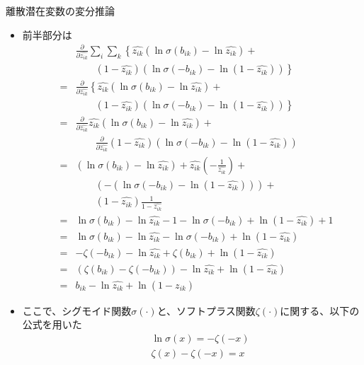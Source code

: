 \documentclass[dvipdfmx,notheorems,t]{beamer}
\begin{document}
\begin{frame}{離散潜在変数の変分推論}
\begin{itemize}
\begin{itemize}
		\item 前半部分は
		\begin{eqnarray}
			&& \frac{\partial}{\partial \widehat{z_{ik}}} \sum_i \sum_k \left\{ \widehat{z_{ik}} \left( \ln \sigma(b_{ik}) - \ln \widehat{z_{ik}} \right) + \right. \nonumber \\
			&& \qquad \left. \left( 1 - \widehat{z_{ik}} \right) \left( \ln \sigma(-b_{ik}) - \ln \left( 1 - \widehat{z_{ik}} \right) \right) \right\} \\
			&=& \frac{\partial}{\partial \widehat{z_{ik}}} \left\{ \widehat{z_{ik}} \left( \ln \sigma(b_{ik}) - \ln \widehat{z_{ik}} \right) + \right. \nonumber \\
			&& \qquad \left. \left( 1 - \widehat{z_{ik}} \right) \left( \ln \sigma(-b_{ik}) - \ln \left( 1 - \widehat{z_{ik}} \right) \right) \right\} \\
			&=& \frac{\partial}{\partial \widehat{z_{ik}}} \widehat{z_{ik}} \left( \ln \sigma(b_{ik}) - \ln \widehat{z_{ik}} \right) + \nonumber \\
			&& \qquad \frac{\partial}{\partial \widehat{z_{ik}}} \left( 1 - \widehat{z_{ik}} \right) \left( \ln \sigma(-b_{ik}) - \ln \left( 1 - \widehat{z_{ik}} \right) \right) \\
			&=& \left( \ln \sigma(b_{ik}) - \ln \widehat{z_{ik}} \right) + \widehat{z_{ik}} \left( -\frac{1}{\widehat{z_{ik}}} \right) + \nonumber \\
			&& \qquad \left( - \left( \ln \sigma(-b_{ik}) - \ln \left( 1 - \widehat{z_{ik}} \right) \right) \right) + \nonumber \\
			&& \qquad \left( 1 - \widehat{z_{ik}} \right) \frac{1}{1 - \widehat{z_{ik}}} \\
			&=& \ln \sigma(b_{ik}) - \ln \widehat{z_{ik}} - 1 - \ln \sigma(-b_{ik}) + \ln (1 - \widehat{z_{ik}}) + 1 \\
			&=& \ln \sigma(b_{ik}) - \ln \widehat{z_{ik}} - \ln \sigma(-b_{ik}) + \ln (1 - \widehat{z_{ik}}) \\
			&=& - \zeta(-b_{ik}) - \ln \widehat{z_{ik}} + \zeta(b_{ik}) + \ln (1 - \widehat{z_{ik}}) \\
			&=& \left( \zeta(b_{ik}) - \zeta(-b_{ik}) \right) - \ln \widehat{z_{ik}} + \ln (1 - \widehat{z_{ik}}) \\
			&=& b_{ik} - \ln \widehat{z_{ik}} + \ln (1 - \widehat{z_{ik}})
		\end{eqnarray}
		
		\item ここで、シグモイド関数$\sigma(\cdot)$と、ソフトプラス関数$\zeta(\cdot)$に関する、以下の公式を用いた
		\begin{eqnarray}
			&& \ln \sigma(x) = -\zeta(-x) \\
			&& \zeta(x) - \zeta(-x) = x
		\end{eqnarray}
		

\end{itemize}
\end{itemize}
\end{frame}
\end{document}
